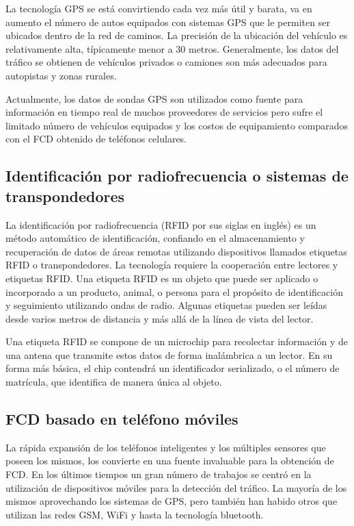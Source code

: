 \documentclass[final,fmstyle]{fpunathesis}
\begin{document}
La tecnología GPS se está convirtiendo cada vez más útil y barata, va en aumento el número de autos equipados con sistemas GPS que le permiten ser ubicados dentro de la red de caminos. La precisión de la ubicación del vehículo es relativamente alta, típicamente menor a 30 metros. Generalmente, los datos del tráfico se obtienen de vehículos privados o camiones son más adecuados para autopistas y zonas rurales.

Actualmente, los datos de sondas GPS son utilizados como fuente para información en tiempo real de muchos proveedores de servicios pero sufre el limitado número de vehículos equipados y los costos de equipamiento comparados con el FCD obtenido de teléfonos celulares.

\subsection{Identificación por radiofrecuencia o sistemas de transpondedores}

La identificación por radiofrecuencia (RFID por sus siglas en inglés)  es un método automático de identificación, confiando en el almacenamiento y recuperación de datos de áreas remotas utilizando dispositivos llamados etiquetas RFID o transpondedores. La tecnología requiere la cooperación entre lectores y etiquetas RFID. Una etiqueta RFID es un objeto que puede ser aplicado o incorporado a un producto, animal, o persona para el propósito de identificación y seguimiento utilizando ondas de radio. Algunas etiquetas pueden ser leídas desde varios metros de distancia y más allá de la línea de vista del lector.

Una etiqueta RFID se compone de un microchip para recolectar información y de una antena que transmite estos datos de forma inalámbrica a un lector. En su forma más básica, el chip contendrá un identificador serializado, o el número de matrícula, que identifica de manera única al objeto.

\subsection{FCD basado en teléfono móviles}

La rápida expansión de los teléfonos inteligentes y los múltiples sensores que poseen los mismos, los convierte en una fuente invaluable para la obtención de FCD. En los últimos tiempos un gran número de trabajos se centró en la utilización de dispositivos móviles para la detección del tráfico. La mayoría de los mismos aprovechando los sistemas de GPS, pero también han habido otros que utilizan las redes GSM, WiFi y hasta la tecnología bluetooth.
\end{document}
